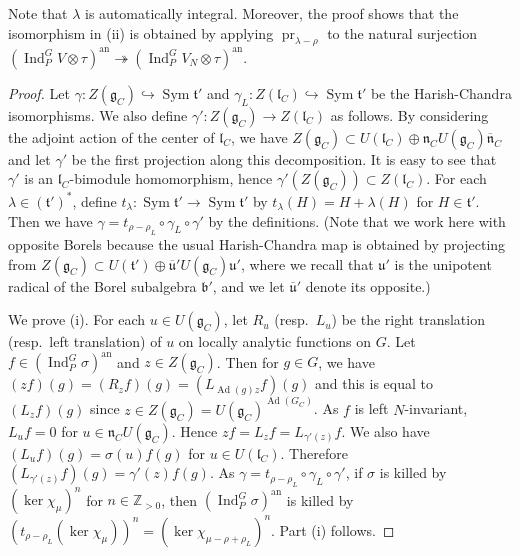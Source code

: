 \documentclass[a4paper]{amsart}
\numberwithin{equation}{section}
\theoremstyle{remark}
\theoremstyle{definition}
\DeclareMathOperator{\Ind}{Ind}
\DeclareMathOperator{\Ad}{Ad}
\DeclareMathOperator{\pr}{pr}
\newcommand{\Z}{\mathbb{Z}}
\DeclareMathOperator{\Sym}{Sym}
\newcommand{\an}{\mathrm{an}}
\newcommand{\into}{\hookrightarrow}
\newcommand{\onto}{\twoheadrightarrow}
\begin{document}
Note that $\lambda$ is automatically integral.
Moreover, the proof shows that the isomorphism in (ii) is obtained by applying $\pr_{\lambda-\rho}$ to the natural surjection $(\Ind_{P}^{G}V \otimes \tau)^{\an}\onto (\Ind_{P}^{G}V_{N}\otimes \tau)^{\an}$.

\begin{proof}
Let $\gamma\colon Z(\mathfrak{g}_C)\into \Sym\mathfrak{t}'$ and $\gamma_{L}\colon Z(\mathfrak{l}_C)\into \Sym\mathfrak{t}'$ be the Harish-Chandra isomorphisms.
We also define $\gamma'\colon Z(\mathfrak{g}_{C})\to Z(\mathfrak{l}_{C})$ as follows.
By considering the adjoint action of the center of $\mathfrak{l}_{C}$, we have $Z(\mathfrak{g}_{C})\subset U(\mathfrak{l}_{C})\oplus \mathfrak{n}_{C}U(\mathfrak{g}_{C})\overline{\mathfrak{n}}_{C}$ and let $\gamma'$ be the first projection along this decomposition.
It is easy to see that $\gamma'$ is an $\mathfrak{l}_{C}$-bimodule homomorphism, hence $\gamma'(Z(\mathfrak{g}_{C}))\subset Z(\mathfrak{l}_{C})$.
For each $\lambda\in (\mathfrak{t}')^{*}$, define $t_{\lambda}\colon \Sym\mathfrak{t}'\to \Sym\mathfrak{t}'$ by $t_{\lambda}(H) = H + \lambda(H)$ for $H\in \mathfrak{t}'$.
Then we have $\gamma = t_{\rho - \rho_{L}}\circ\gamma_{L}\circ\gamma'$ by the definitions.
(Note that we work here with opposite Borels because the usual Harish-Chandra map is obtained by projecting from $Z(\mathfrak{g}_{C})\subset U(\mathfrak{t}')\oplus \overline{\mathfrak{u}}'U(\mathfrak{g}_{C})\mathfrak{u}'$, where we recall that $\mathfrak{u}'$ is the unipotent radical of the Borel subalgebra $\mathfrak{b}'$, and we let $\overline{\mathfrak{u}}'$ denote its opposite.)

We prove (i).
For each $u\in U(\mathfrak{g}_C)$, let $R_{u}$ (resp.\ $L_{u}$) be the right translation (resp.\ left translation) of $u$ on locally analytic functions on $G$.
Let $f\in (\Ind_{P}^{G}\sigma)^{\an}$ and $z\in Z(\mathfrak{g}_{C})$.
Then for $g\in G$, we have $(zf)(g) = (R_{z}f)(g) = (L_{\Ad(g)z}f)(g)$ and this is equal to $(L_{z}f)(g)$ since $z\in Z(\mathfrak{g}_{C}) = U(\mathfrak{g}_{C})^{\Ad(G_{C})}$.
As $f$ is left $N$-invariant, $L_{u}f = 0$ for $u\in \mathfrak{n}_{C}U(\mathfrak{g}_{C})$.
Hence $zf = L_{z}f = L_{\gamma'(z)}f$.
We also have $(L_{u}f)(g) = \sigma(u)f(g)$ for $u\in U(\mathfrak{l}_{C})$.
Therefore $(L_{\gamma'(z)}f)(g) = \gamma'(z)f(g)$.
As $\gamma = t_{\rho - \rho_{L}}\circ\gamma_{L}\circ\gamma'$, if $\sigma$ is killed by $(\ker\chi_{\mu})^{n}$ for $n\in\Z_{>0}$, then $(\Ind_{P}^{G}\sigma)^{\an}$ is killed by $(t_{\rho - \rho_{L}}(\ker\chi_{\mu}))^{n} = (\ker\chi_{\mu - \rho + \rho_{L}})^{n}$.
Part (i) follows.


\end{proof}
\end{document}
